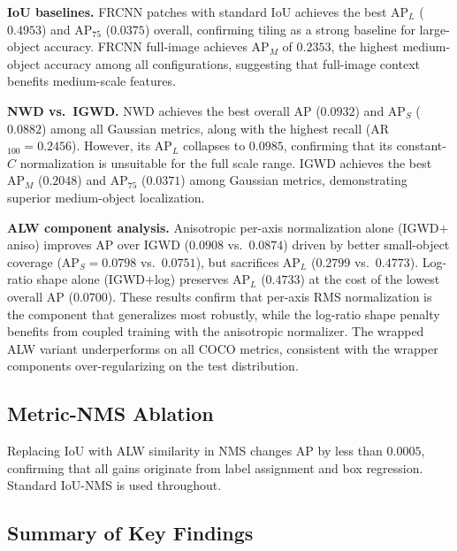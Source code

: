 \textbf{IoU baselines.} FRCNN patches with standard IoU achieves the best
AP$_{L}$ ($0.4953$) and AP$_{75}$ ($0.0375$) overall, confirming tiling as
a strong baseline for large-object accuracy. FRCNN full-image achieves
AP$_{M}$ of $0.2353$, the highest medium-object accuracy among all
configurations, suggesting that full-image context benefits medium-scale
features.

\textbf{NWD vs.\ IGWD.} NWD achieves the best overall AP ($0.0932$) and
AP$_{S}$ ($0.0882$) among all Gaussian metrics, along with the highest
recall (AR$_{100}=0.2456$). However, its AP$_{L}$ collapses to $0.0985$,
confirming that its constant-$C$ normalization is unsuitable for the full
scale range. IGWD achieves the best AP$_{M}$ ($0.2048$) and AP$_{75}$
($0.0371$) among Gaussian metrics, demonstrating superior medium-object
localization.

\textbf{ALW component analysis.} Anisotropic per-axis normalization alone
(IGWD$+$aniso) improves AP over IGWD ($0.0908$ vs.\ $0.0874$) driven by
better small-object coverage (AP$_{S}=0.0798$ vs.\ $0.0751$), but
sacrifices AP$_{L}$ ($0.2799$ vs.\ $0.4773$). Log-ratio shape alone
(IGWD$+$log) preserves AP$_{L}$ ($0.4733$) at the cost of the lowest
overall AP ($0.0700$). These results confirm that per-axis RMS
normalization is the component that generalizes most robustly, while the
log-ratio shape penalty benefits from coupled training with the anisotropic
normalizer. The wrapped ALW variant underperforms on all COCO metrics,
consistent with the wrapper components over-regularizing on the test
distribution.

\subsection{Metric-NMS Ablation}
\label{sec:exp-nms}

Replacing IoU with ALW similarity in NMS changes AP by less than
$0.0005$, confirming that all gains originate from label assignment and
box regression. Standard IoU-NMS is used throughout.

\subsection{Summary of Key Findings}
\label{sec:exp-findings}

